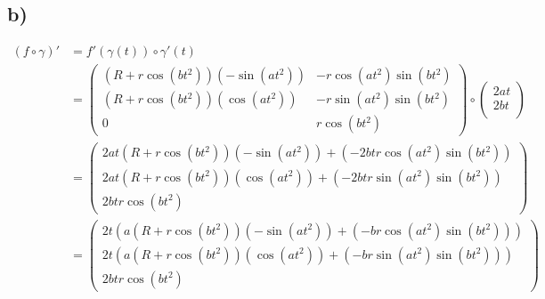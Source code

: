 \documentclass[10pt,a4paper]{article}
\begin{document}
\subsection*{b)}
\begin{align*}
(f\circ\gamma)' &= f'(\gamma(t)) \circ \gamma'(t)\\
&= \begin{pmatrix}
    (R + r \cos (bt^2)) ( -\sin (at^2)) & - r \cos (at^2) \sin (bt^2)\\
    (R + r \cos (bt^2)) (\cos (at^2)) & - r \sin (at^2) \sin (bt^2)\\
    0 & r \cos (bt^2)
\end{pmatrix} \circ \begin{pmatrix} 
    2at\\
    2bt\\
\end{pmatrix}\\
&= \begin{pmatrix}
    2at(R + r \cos (bt^2)) ( -\sin (at^2)) + (- 2bt r \cos (at^2) \sin (bt^2))\\
    2at(R + r \cos (bt^2)) (\cos (at^2)) + (-2bt r \sin (at^2) \sin (bt^2))\\
    2bt r \cos (bt^2)
\end{pmatrix}\\
&= \begin{pmatrix}
    2t (a(R + r \cos (bt^2)) ( -\sin (at^2)) + (- b r \cos (at^2) \sin (bt^2)))\\
    2t (a(R + r \cos (bt^2)) (\cos (at^2)) + (-b r \sin (at^2) \sin (bt^2)))\\
    2btr \cos (bt^2)
\end{pmatrix}\\
\end{align*}
\end{document}

